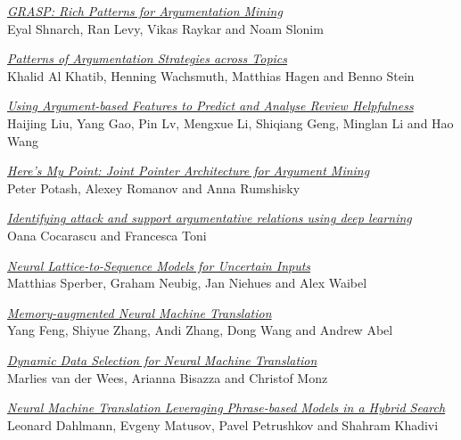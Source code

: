 \hyperlink{page.1354}{\em GRASP: Rich Patterns for Argumentation Mining}\samepage \\
\hspace*{7mm} Eyal Shnarch, Ran Levy, Vikas Raykar and Noam Slonim\dotfill {}

\hyperlink{page.1360}{\em Patterns of Argumentation Strategies across Topics}\samepage \\
\hspace*{7mm} Khalid Al Khatib, Henning Wachsmuth, Matthias Hagen and Benno Stein\dotfill {}

\hyperlink{page.1367}{\em Using Argument-based Features to Predict and Analyse Review Helpfulness}\samepage \\
\hspace*{7mm} Haijing Liu, Yang Gao, Pin Lv, Mengxue Li, Shiqiang Geng, Minglan Li and Hao Wang\dotfill {}

\hyperlink{page.1373}{\em Here's My Point: Joint Pointer Architecture for Argument Mining}\samepage \\
\hspace*{7mm} Peter Potash, Alexey Romanov and Anna Rumshisky\dotfill {}

\hyperlink{page.1383}{\em Identifying attack and support argumentative relations using deep learning}\samepage \\
\hspace*{7mm} Oana Cocarascu and Francesca Toni\dotfill {}

\hyperlink{page.1389}{\em Neural Lattice-to-Sequence Models for Uncertain Inputs}\samepage \\
\hspace*{7mm} Matthias Sperber, Graham Neubig, Jan Niehues and Alex Waibel\dotfill {}

\hyperlink{page.1399}{\em Memory-augmented Neural Machine Translation}\samepage \\
\hspace*{7mm} Yang Feng, Shiyue Zhang, Andi Zhang, Dong Wang and Andrew Abel\dotfill {}

\hyperlink{page.1409}{\em Dynamic Data Selection for Neural Machine Translation}\samepage \\
\hspace*{7mm} Marlies van der Wees, Arianna Bisazza and Christof Monz\dotfill {}

\hyperlink{page.1420}{\em Neural Machine Translation Leveraging Phrase-based Models in a Hybrid Search}\samepage \\
\hspace*{7mm} Leonard Dahlmann, Evgeny Matusov, Pavel Petrushkov and Shahram Khadivi\dotfill {}

